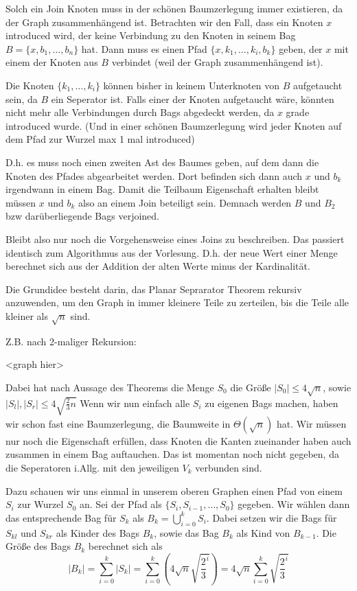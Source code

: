Solch ein Join Knoten muss in der schönen Baumzerlegung immer existieren, da der Graph zusammenhängend ist.
Betrachten wir den Fall, dass ein Knoten $x$ introduced wird, der keine Verbindung zu den Knoten in seinem Bag $B = \{x, b_1, \dots , b_n\}$ hat.
Dann muss es einen Pfad $\{x, k_1, \dots, k_i, b_k\}$ geben, der $x$ mit einem der Knoten aus $B$ verbindet (weil der Graph zusammenhängend ist).

Die Knoten $\{k_1, \dots, k_i\}$ können bisher in keinem Unterknoten von $B$ aufgetaucht sein, da $B$ ein Seperator ist. Falls einer der Knoten aufgetaucht wäre, könnten nicht mehr alle Verbindungen durch Bags abgedeckt werden, da $x$ grade introduced wurde. (Und in einer schönen Baumzerlegung wird jeder Knoten auf dem Pfad zur Wurzel max 1 mal introduced)

D.h. es muss noch einen zweiten Ast des Baumes geben, auf dem dann die Knoten des Pfades abgearbeitet werden. Dort befinden sich dann auch $x$ und $b_k$ irgendwann in einem Bag. Damit die Teilbaum Eigenschaft erhalten bleibt müssen $x$ und $b_k$ also an einem Join beteiligt sein. Demnach werden $B$ und $B_2$ bzw darüberliegende Bags verjoined.

Bleibt also nur noch die Vorgehensweise eines Joins zu beschreiben. Das passiert identisch zum Algorithmus aus der Vorlesung.
D.h. der neue Wert einer Menge berechnet sich aus der Addition der alten Werte minus der Kardinalität.


Die Grundidee besteht darin, das Planar Seprarator Theorem rekursiv anzuwenden, um den Graph in immer kleinere Teile zu zerteilen, bis die Teile alle kleiner als $\sqrt{n}$ sind.

Z.B. nach 2-maliger Rekursion:

<graph hier>

Dabei hat nach Aussage des Theorems die Menge $S_0$ die Größe $|S_0| \leq 4\sqrt{n}$, sowie $|S_l|,|S_r| \leq 4\sqrt{\frac{2}{3}n}$
Wenn wir nun einfach alle $S_i$ zu eigenen Bags machen, haben wir schon fast eine Baumzerlegung, die Baumweite in $\Theta(\sqrt{n})$ hat.
Wir müssen nur noch die Eigenschaft erfüllen, dass Knoten die Kanten zueinander haben auch zusammen in einem Bag auftauchen. Das ist momentan noch nicht gegeben, da die Seperatoren i.Allg. mit den jeweiligen $V_k$ verbunden sind.

Dazu schauen wir uns einmal in unserem oberen Graphen einen Pfad von einem $S_i$ zur Wurzel $S_0$ an. Sei der Pfad als $\{S_i, S_{i-1}, \dots, S_0\}$ gegeben.
Wir wählen dann das entsprechende Bag für $S_k$ als $B_k = \bigcup\limits_{i=0}^k S_i$. Dabei setzen wir die Bags für $S_{kl}$ und $S_{kr}$ als Kinder des Bags $B_k$, sowie das Bag $B_k$ als Kind von $B_{k-1}$.
Die Größe des Bags $B_k$ berechnet sich als
$$ |B_k| = \sum\limits_{i=0}^k |S_k| = \sum\limits_{i=0}^k \left(4\sqrt{n}\sqrt{\frac{2}{3}^i}\right) = 4\sqrt{n}\sum\limits_{i=0}^k \sqrt{\frac{2}{3}^i}$$

